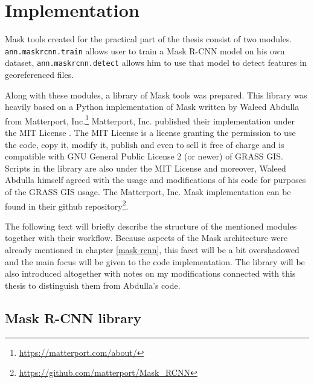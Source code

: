 \chapter{Implementation}
\label{implementation}

Mask  tools created for the practical part of the thesis consist of two modules. \verb|ann.maskrcnn.train| allows user to train a Mask R-CNN model on his own dataset, \verb|ann.maskrcnn.detect| allows him to use that model to detect features in georeferenced files. 

Along with these modules, a library of Mask  tools was prepared. This library was heavily based on a Python implementation of Mask  written by Waleed Abdulla from Matterport, Inc.\footnote{\url{https://matterport.com/about/}}  Matterport, Inc. published their implementation under the MIT License \cite{mit}. The MIT License is a license granting the permission to use the code, copy it, modify it, publish and even to sell it free of charge and is compatible with GNU General Public License 2 (or newer) \cite{gplv2} of GRASS GIS. Scripts in the library are also under the MIT License and moreover, Waleed Abdulla himself agreed with the usage and modifications of his code for purposes of the GRASS GIS usage. The Matterport, Inc. Mask  implementation can be found in their github repository\footnote{\url{https://github.com/matterport/Mask\_RCNN}}.


The following text will briefly describe the structure of the mentioned modules together with their workflow. Because aspects of the Mask  architecture were already mentioned in chapter \ref{mask-rcnn}, this facet will be a bit overshadowed and the main focus will be given to the code implementation. The library will be also introduced altogether with notes on my modifications connected with this thesis to distinguish them from Abdulla's code.

\section{Mask R-CNN library}
\label{library}

